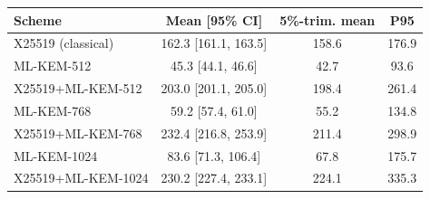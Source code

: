 \begin{tabular}{|l|c|c|c|}
\hline
\textbf{Scheme} & \textbf{Mean [95\% CI]} & \textbf{5\%-trim. mean} & \textbf{P95} \\
\hline
X25519 (classical) & 162.3 [161.1, 163.5] & 158.6 & 176.9 \\ \hline
ML-KEM-512 & 45.3 [44.1, 46.6] & 42.7 & 93.6 \\ \hline
X25519+ML-KEM-512 & 203.0 [201.1, 205.0] & 198.4 & 261.4 \\ \hline
ML-KEM-768 & 59.2 [57.4, 61.0] & 55.2 & 134.8 \\ \hline
X25519+ML-KEM-768 & 232.4 [216.8, 253.9] & 211.4 & 298.9 \\ \hline
ML-KEM-1024 & 83.6 [71.3, 106.4] & 67.8 & 175.7 \\ \hline
X25519+ML-KEM-1024 & 230.2 [227.4, 233.1] & 224.1 & 335.3 \\ \hline
\end{tabular}
